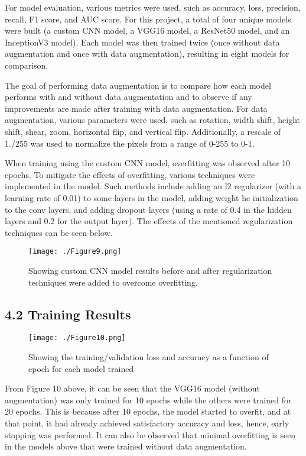 \documentclass[
]{article}
\begin{document}
For model evaluation, various metrics were used, such as accuracy, loss,
precision, recall, F1 score, and AUC score. For this project, a total of
four unique models were built (a custom CNN model, a VGG16 model, a
ResNet50 model, and an InceptionV3 model). Each model was then trained
twice (once without data augmentation and once with data augmentation),
resulting in eight models for comparison.

The goal of performing data augmentation is to compare how each model
performs with and without data augmentation and to observe if any
improvements are made after training with data augmentation. For data
augmentation, various parameters were used, such as rotation, width
shift, height shift, shear, zoom, horizontal flip, and vertical flip.
Additionally, a rescale of 1./255 was used to normalize the pixels from
a range of 0-255 to 0-1.

When training using the custom CNN model, overfitting was observed after
10 epochs. To mitigate the effects of overfitting, various techniques
were implemented in the model. Such methods include adding an l2
regularizer (with a learning rate of 0.01) to some layers in the model,
adding weight he initialization to the conv layers, and adding dropout
layers (using a rate of 0.4 in the hidden layers and 0.2 for the output
layer). The effects of the mentioned regularization techniques can be
seen below.

\begin{figure}[hbt!]
  \centering
  \texttt{[image: ./Figure9.png]}
  \caption{Showing custom CNN model results before and after
regularization techniques were added to overcome overfitting.}
  \label{fig:figure5}
\end{figure}

\hypertarget{training-results}{%
\subsection{\texorpdfstring{\textbf{4.2 Training
Results}}{4.2 Training Results}}\label{training-results}}

\begin{figure}[hbt!]
  \centering
  \texttt{[image: ./Figure10.png]}
  \caption{Showing the training/validation loss and accuracy as a
function of epoch for each model trained}
  \label{fig:figure5}
\end{figure}

From Figure 10 above, it can be seen that the VGG16 model (without
augmentation) was only trained for 10 epochs while the others were
trained for 20 epochs. This is because after 10 epochs, the model
started to overfit, and at that point, it had already achieved
satisfactory accuracy and loss, hence, early stopping was performed. It
can also be observed that minimal overfitting is seen in the models
above that were trained without data augmentation.
\end{document}
